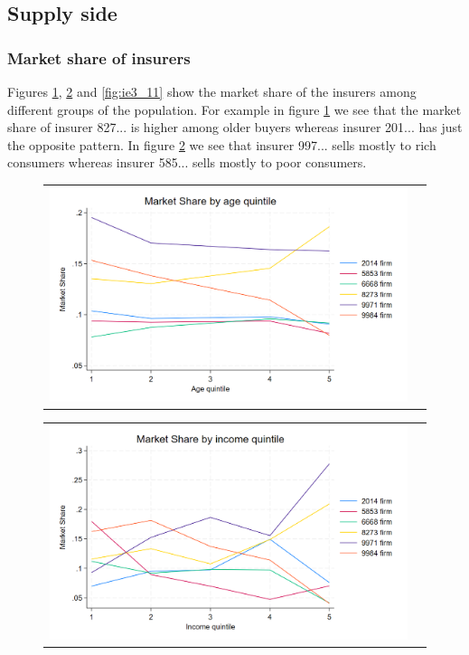 \documentclass[12pt]{article}
\begin{document}
\subsection{Supply side}

\subsubsection{Market share of insurers}
Figures \ref{fig:ie3_9}, \ref{fig:ie3_10} and \ref{fig:ie3_11} show the market share of the insurers among different groups of the population. 
For example in figure \ref{fig:ie3_9} we see that the market share of insurer 827... is higher among older buyers whereas insurer 201... has just the opposite pattern. 
In figure \ref{fig:ie3_10} we see that insurer 997... sells mostly to rich consumers whereas insurer 585... sells mostly to poor consumers. 


\begin{figure}[H]
\caption{}
\label{fig:ie3_9}
\centering{}%
\begin{tabular}{cc}
\includegraphics[scale=0.27]{../figures/IE3_supply_age_quintile.png}
\end{tabular}
\end{figure}

\begin{figure}[H]
\caption{}
\label{fig:ie3_10}
\centering{}%
\begin{tabular}{cc}
\includegraphics[scale=0.27]{../figures/IE3_supply_income_quintile.png}
\end{tabular}
\end{figure}
\end{document}
